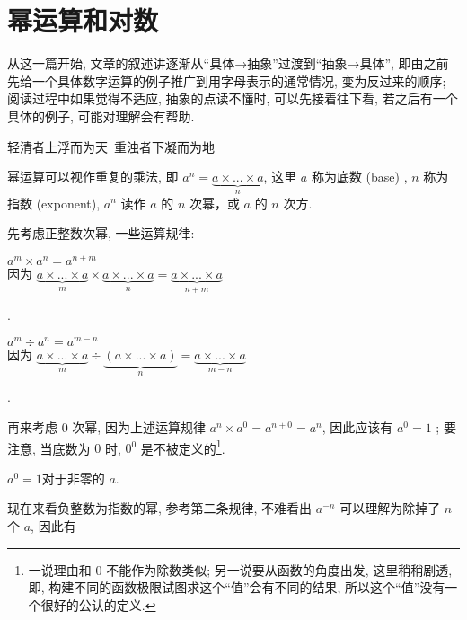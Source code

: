 \section{幂运算和对数}\label{002}

从这一篇开始,
  文章的叙述讲逐渐从``具体→抽象''过渡到``抽象→具体'',
  即由之前先给一个具体数字运算的例子推广到用字母表示的通常情况,
  变为反过来的顺序; 阅读过程中如果觉得不适应, 抽象的点读不懂时,
  可以先接着往下看, 若之后有一个具体的例子, 可能对理解会有帮助.
  
\begin{flushright}{\kaishu 轻清者上浮而为天\ 重浊者下凝而为地}\end{flushright}

\begin{tcolorbox}[size=fbox, breakable, enhanced jigsaw, title={幂运算
(exponentiation)}]

幂运算可以视作重复的乘法, 即
$a^n=\underbrace{a\times ...\times a}_{n}$, 这里 $a$ 称为底数 (base)
, $n$ 称为指数 (exponent),
$a^n$ 读作 $a$ 的 $n$ 次幂，或 $a$ 的 $n$ 次方.

先考虑正整数次幂, 一些运算规律:

\begin{itemize}

{\item
$\boxed{a^m\times a^n=a^{n+m}}$\\
因为 $\underbrace{a\times ...\times a}_{m}\times\underbrace{a\times ...\times a}_{n}=\underbrace{a\times ...\times a}_{n+m}$}.
{\item
$\boxed{a^m\div a^n=a^{m-n}}$\\
因为 $\underbrace{a\times ...\times a}_{m}\div\underbrace{(a\times ...\times a)}_{n}=\underbrace{a\times ...\times a}_{m-n}$}.
\end{itemize}

再来考虑 $0$ 次幂, 因为上述运算规律 $a^n\times a^0=a^{n+0}=a^n$,
因此应该有 $a^0=1$ ; 要注意, 当底数为 $0$ 时, $0^0$
是不被定义的\footnote{一说理由和 $0$ 不能作为除数类似;
  另一说要从函数的角度出发, 这里稍稍剧透, 即,
  构建不同的函数极限试图求这个``值''会有不同的结果,
  所以这个``值''没有一个很好的公认的定义.}.

\begin{itemize}

{\item
  $\boxed{a^0=1}$对于非零的 $a$.}
\end{itemize}

现在来看负整数为指数的幂, 参考第二条规律, 不难看出 $a^{-n}$
可以理解为除掉了 $n$ 个 $a$, 因此有


\end{tcolorbox}
